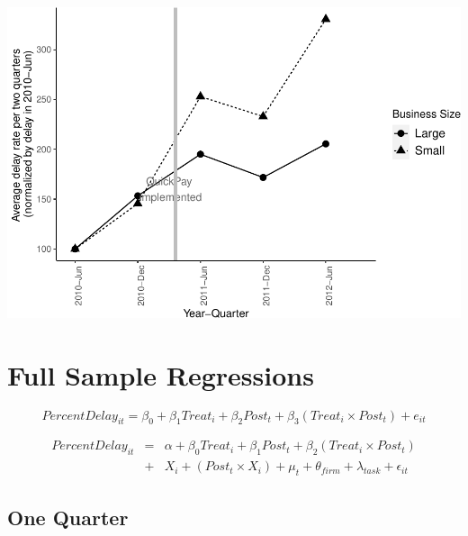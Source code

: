 \documentclass[
]{article}
\begin{document}
\includegraphics{qp_first_pc_delay_two_quarters_files/figure-latex/normalized_plot-1.pdf}

\hypertarget{full-sample-regressions}{%
\section{Full Sample Regressions}\label{full-sample-regressions}}

\[ PercentDelay_{it} = \beta_0 + \beta_1 Treat_i + \beta_2 Post_t + \beta_3 (Treat_i \times Post_t) + e_{it}\]

\[ \begin{aligned} PercentDelay_{it} &=& \alpha+\beta_0 Treat_i + \beta_1 Post_t + \beta_2 (Treat_i \times Post_t)\\
&+&  X_i + (Post_t \times X_i) + \mu_t + \theta_{firm} + \lambda_{task}+ \epsilon_{it}
\end{aligned}\]

\hypertarget{one-quarter}{%
\subsection{One Quarter}\label{one-quarter}}
\end{document}
